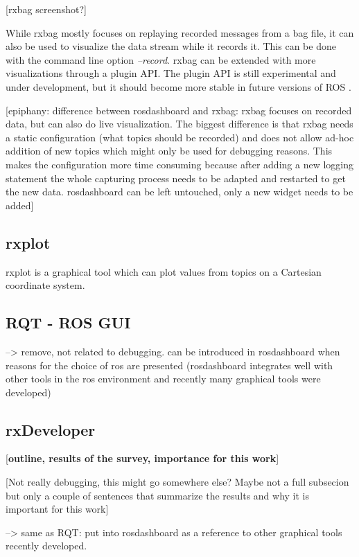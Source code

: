 [rxbag screenshot?]

While rxbag mostly focuses on replaying recorded messages from a bag file, it can also be used to visualize the data stream while it records it. This can be done with the command line option \emph{--record}. rxbag can be extended with more visualizations through a plugin API. The plugin API is still experimental and under development, but it should become more stable in future versions of ROS \cite{rxbag}.

[epiphany: difference between rosdashboard and rxbag: rxbag focuses on recorded data, but can also do live visualization. The biggest difference is that rxbag needs a static configuration (what topics should be recorded) and does not allow ad-hoc addition of new topics which might only be used for debugging reasons. This makes the configuration more time consuming because after adding a new logging statement the whole capturing process needs to be adapted and restarted to get the new data. rosdashboard can be left untouched, only a new widget needs to be added]


\subsection{rxplot}
rxplot is a graphical tool which can plot values from topics on a Cartesian coordinate system. 

\subsection{RQT - ROS GUI}
--> remove, not related to debugging. can be introduced in rosdashboard when reasons for the choice of ros are presented (rosdashboard integrates well with other tools in the ros environment and recently many graphical tools were developed)
\subsection{rxDeveloper}
[\textbf{outline, results of the survey, importance for this work}]
\cite{Muellers2012}

[Not really debugging, this might go somewhere else? Maybe not a full subsecion but only a couple of sentences that summarize the results and why it is important for this work]

--> same as RQT: put into rosdashboard as a reference to other graphical tools recently developed.


